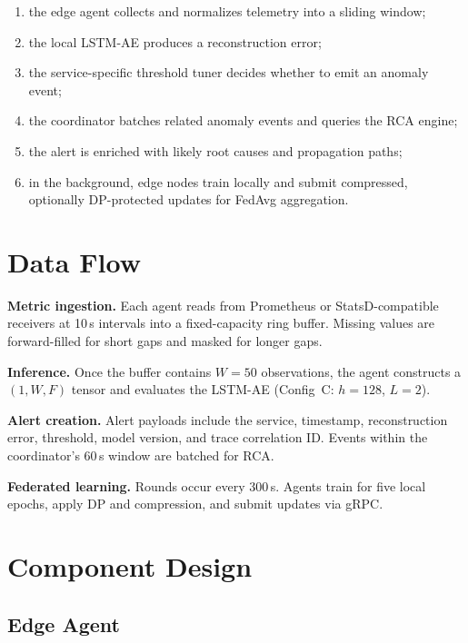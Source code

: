 \begin{enumerate}
    \item the edge agent collects and normalizes telemetry into a sliding window;
    \item the local LSTM-AE produces a reconstruction error;
    \item the service-specific threshold tuner decides whether to emit an
    anomaly event;
    \item the coordinator batches related anomaly events and queries the RCA
    engine;
    \item the alert is enriched with likely root causes and propagation paths;
    \item in the background, edge nodes train locally and submit compressed,
    optionally DP-protected updates for FedAvg aggregation.
\end{enumerate}

\section{Data Flow}
\label{sec:design_dataflow}

\textbf{Metric ingestion.} Each agent reads from Prometheus or StatsD-compatible
receivers at 10\,s intervals into a fixed-capacity ring buffer. Missing values
are forward-filled for short gaps and masked for longer gaps.

\textbf{Inference.} Once the buffer contains $W=50$ observations, the agent
constructs a $(1,W,F)$ tensor and evaluates the LSTM-AE (Config~C: $h{=}128$,
$L{=}2$).

\textbf{Alert creation.} Alert payloads include the service, timestamp,
reconstruction error, threshold, model version, and trace correlation ID.
Events within the coordinator's 60\,s window are batched for RCA.

\textbf{Federated learning.} Rounds occur every 300\,s. Agents train for five
local epochs, apply DP and compression, and submit updates via gRPC.

\section{Component Design}
\label{sec:design_components}

\subsection{Edge Agent}
\label{subsec:design_edge_agent}

